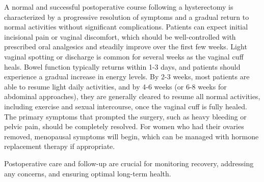A normal and successful postoperative course following a hysterectomy is characterized by a progressive resolution of symptoms and a gradual return to normal activities without significant complications. Patients can expect initial incisional pain or vaginal discomfort, which should be well-controlled with prescribed oral analgesics and steadily improve over the first few weeks. Light vaginal spotting or discharge is common for several weeks as the vaginal cuff heals. Bowel function typically returns within 1-3 days, and patients should experience a gradual increase in energy levels. By 2-3 weeks, most patients are able to resume light daily activities, and by 4-6 weeks (or 6-8 weeks for abdominal approaches), they are generally cleared to resume all normal activities, including exercise and sexual intercourse, once the vaginal cuff is fully healed. The primary symptoms that prompted the surgery, such as heavy bleeding or pelvic pain, should be completely resolved. For women who had their ovaries removed, menopausal symptoms will begin, which can be managed with hormone replacement therapy if appropriate.

Postoperative care and follow-up are crucial for monitoring recovery, addressing any concerns, and ensuring optimal long-term health.

